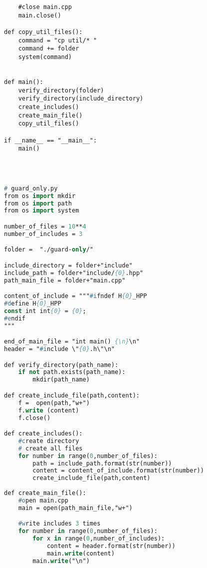 \begin{apendicesenv}
\begin{lstlisting}
    #close main.cpp
    main.close()

def copy_util_files():
    command = "cp util/* "
    command += folder
    system(command)
    

def main():
    verify_directory(folder)
    verify_directory(include_directory)
    create_includes()
    create_main_file()
    copy_util_files()

if __name__ == "__main__":
    main()
\end{lstlisting}

\begin{lstlisting}[language=Pascal,frame=single,captionpos=b,
                                                caption={
                     Script usando para gerar diretorios com Guardas de Inclusão Interna},
                                                            label=script_intenal_include]



# guard_only.py
from os import mkdir
from os import path
from os import system

number_of_files = 10**4
number_of_includes = 3

folder =  "./guard-only/"

include_directory = folder+"include"
include_path = folder+"include/{0}.hpp"
path_main_file = folder+"main.cpp"

content_of_include = """#ifndef H{0}_HPP
#define H{0}_HPP
const int int{0} = {0};
#endif
"""

end_of_main_file = "int main() {\n}\n"
header = "#include \"{0}.h\"\n"

def verify_directory(path_name):
    if not path.exists(path_name):
        mkdir(path_name)

def create_include_file(path,content):
    f =  open(path,"w+")
    f.write (content)
    f.close()

def create_includes():
    #create directory
    # create all files
    for number in range(0,number_of_files):
        path = include_path.format(str(number))
        content = content_of_include.format(str(number))
        create_include_file(path,content)
    
def create_main_file():
    #open main.cpp
    main = open(path_main_file,"w+")

    #write includes 3 times
    for number in range(0,number_of_files):
        for x in range(0,number_of_includes):
            content = header.format(str(number))
            main.write(content)
        main.write("\n")


\end{lstlisting}
\end{apendicesenv}
